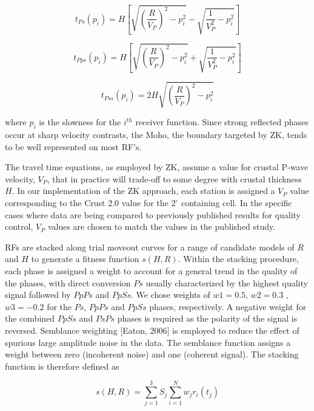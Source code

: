 \documentclass[draft, 12pt]{article}
\begin{document}
\begin{equation} \label{eq:tps}
t_{Ps}(p_i)=H \left[ \sqrt{ \left(\frac{R}{V_P}\right)^2 - p_i^2} - \sqrt{\frac{1}{V_P^2} - p_i^2} \right]
\end{equation}

\begin{equation}
t_{Pps}(p_i)=H \left[ \sqrt{ \left(\frac{R}{V_P}\right)^2 - p_i^2} + \sqrt{\frac{1}{V_P^2} - p_i^2} \right]
\end{equation}

\begin{equation}
t_{Pss}(p_i)= 2H  \sqrt{ \left(\frac{R}{V_P}\right)^2 - p_i^2}
\end{equation}

where $p_i$ is the slowness for the $i^{th}$ receiver function. Since strong reflected phases occur at sharp velocity contrasts, the Moho, the boundary targeted by ZK, tends to be well represented on most RF's.

The travel time equations, as employed by ZK, assume a value for crustal P-wave velocity, $V_P$, that in practice will trade-off to some degree with crustal thickness $H$. In our implementation of the ZK approach, each station is assigned a $V_P$ value corresponding to the Crust 2.0 value for the $2^\circ$ containing cell. In the specific cases where data are being compared to previously published results for quality control, $V_P$  values are chosen to match the values in the published study.

RFs are stacked along trial moveout curves for a range of candidate models of $R$ and $H$ to generate a fitness function $s(H,R)$.  Within the stacking procedure, each phase is assigned a weight to account for a general trend in the quality of the phases, with direct conversion $Ps$ usually characterized by the highest quality signal followed by $PpPs$ and $PpSs$. We chose weights of $w1 = 0.5$, $w2 = 0.3$ , $w3 = -0.2$ for the $Ps$, $PpPs$ and $PpSs$ phases, respectively. A negative weight for the combined $PpSs$ and $PsPs$ phases is required as the polarity of the signal is reversed. Semblance weighting [Eaton, 2006] is employed to reduce the effect of spurious large amplitude noise in the data. The semblance function assigns a weight between zero (incoherent noise) and one (coherent signal). The stacking function is therefore defined as

\begin{equation}  \label{eq:stack}
s(H,R) = \sum_{j=1}^{3} S_j \sum_{i=1}^N w_jr_i(t_j)
\end{equation}
\end{document}
